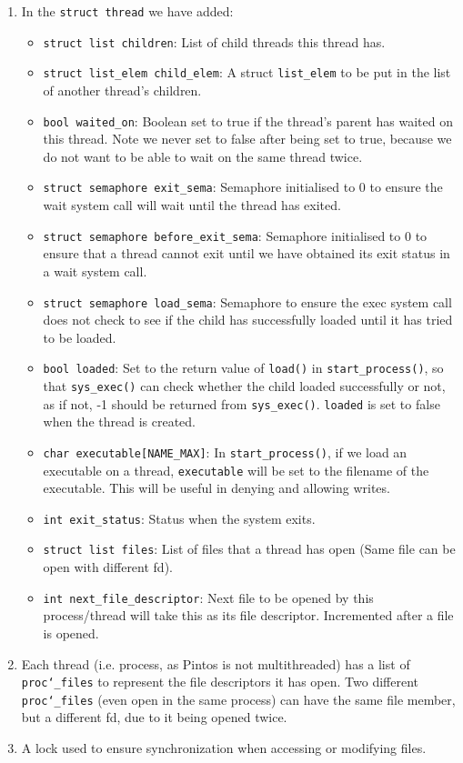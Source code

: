 \documentclass{article}
\renewcommand{\_}{\char`_}
\renewcommand{\tt}{\lstinline}
\begin{document}
\begin{enumerate}
\item In the \texttt{struct thread} we have added:
\begin{itemize}
\item \lstinline{struct list children}: List of child threads this thread has. 
\item \lstinline{struct list_elem child_elem}: A struct \lstinline{list_elem} to be put in the list of another thread's children. 
\item \lstinline{bool waited_on}: Boolean set to true if the thread's parent has waited on this thread. Note we never set to false after 
being set to true, because we do not want to be able to wait on the same thread twice.
\item \lstinline{struct semaphore exit_sema}: Semaphore initialised to 0 to ensure the wait system call will wait until the thread has exited.
\item \lstinline{struct semaphore before_exit_sema}: Semaphore initialised to 0 to ensure that a thread cannot exit until we have obtained its exit status in a wait system call.
\item \lstinline{struct semaphore load_sema}: Semaphore to ensure the exec system call does not check to see if the child has successfully loaded until it has tried to be loaded.
\item \lstinline{bool loaded}: Set to the return value of \lstinline{load()} in \lstinline{start_process()}, so that \lstinline{sys_exec()} can check whether the child loaded successfully or not, as if not, -1 should be returned from \lstinline{sys_exec()}. \lstinline{loaded} is set to false when the thread is created. 
\item \lstinline{char executable[NAME_MAX]}: In \tt{start_process()}, if we load an executable on a thread,  \lstinline{executable} will be set to the filename of the executable. This will be useful in denying and allowing writes. 
\item \lstinline{int exit_status}: Status when the system exits.
\item \lstinline{struct list files}: List of files that a thread has open (Same file can be open with different fd).
\item \lstinline{int next_file_descriptor}: Next file to be opened by this process/thread will take this as its file descriptor. Incremented after a file is opened.
\end{itemize}
\item Each thread (i.e. process, as Pintos is not multithreaded) has a list of \texttt{proc\_files} to represent the file descriptors it has open. Two different \texttt{proc\_files} (even open in the same process) can have the same file member, but a different fd, due to it being opened twice. 
\item A lock used to ensure synchronization when accessing or modifying files.

\end{enumerate}
\end{document}
